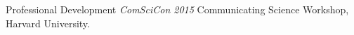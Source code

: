 \begin{rubric}{Professional Development}
%
\entry*[2015]
    \emph{ComSciCon 2015} Communicating Science Workshop, Harvard University.
%
\end{rubric}

